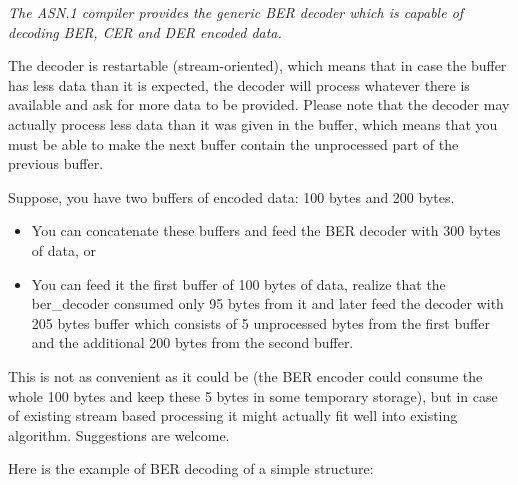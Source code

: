 \documentclass[english,oneside,12pt]{book}
\begin{document}
\emph{The ASN.1 compiler provides the generic BER decoder which is
capable of decoding BER, CER and DER encoded data.}

The decoder is restartable (stream-oriented), which means that in
case the buffer has less data than it is expected, the decoder will
process whatever there is available and ask for more data to be provided.
Please note that the decoder may actually process less data than it
was given in the buffer, which means that you must be able to make
the next buffer contain the unprocessed part of the previous buffer.

Suppose, you have two buffers of encoded data: 100 bytes and 200 bytes.
\begin{itemize}
\item You can concatenate these buffers and feed the BER decoder with 300
bytes of data, or
\item You can feed it the first buffer of 100 bytes of data, realize that
the ber\_decoder consumed only 95 bytes from it and later feed the
decoder with 205 bytes buffer which consists of 5 unprocessed bytes
from the first buffer and the additional 200 bytes from the second
buffer.
\end{itemize}
This is not as convenient as it could be (the BER encoder could
consume the whole 100 bytes and keep these 5 bytes in some temporary
storage), but in case of existing stream based processing it might
actually fit well into existing algorithm. Suggestions are welcome.

Here is the example of BER decoding of a simple structure:

\end{document}
